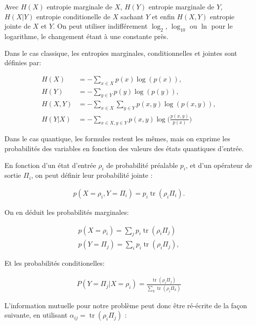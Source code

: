 \documentclass[12pt,a4paper]{article}
\DeclareMathOperator{\tr}{tr}
\begin{document}
    Avec $H(X)$ entropie marginale de $X$, $H(Y)$ entropie marginale de $Y$, $H(X|Y)$ entropie conditionelle de $X$ sachant $Y$ et enfin $H(X, Y)$ entropie jointe de $X$ et $Y$. On peut utiliser indifférement $\log_2$, $\log_{10}$ ou $\ln$ pour le logarithme, le changement étant à une constante près.

    Dans le cas classique, les entropies marginales, conditionnelles et jointes sont définies par: 
    
    \begin{align}
        H(X) &= -\displaystyle \sum_{x \in X} p(x) \log(p(x)) , \\
        H(Y) &= -\displaystyle \sum_{y \in Y} p(y) \log(p(y)) , \\
        H(X, Y) &= -\displaystyle \sum_{x \in X} \displaystyle \sum_{y \in Y} p(x, y) \log(p(x, y)), \\
        H(Y|X) &= -\displaystyle \sum_{x \in X, y \in Y} p(x, y) \log \big(\frac{p(x, y)}{p(x)}\big)
    \end{align}

    Dans le cas quantique, les formules restent les mêmes, mais on exprime les probabilités des variables en fonction des valeurs des états quantiques d'entrée.

    En fonction d'un état d'entrée $\rho_i$ de probabilité préalable $p_i$, et d'un opérateur de sortie $\Pi_i$, on peut définir leur probabilité jointe :

    \begin{align}
        p(X = \rho_i, Y = \Pi_i) = p_i \tr(\rho_i \Pi_i).
    \end{align}

    On en déduit les probabilités marginales:

    \begin{align}
        p(X = \rho_i) = \displaystyle \sum_{j}p_i \tr(\rho_i \Pi_j)  \\
        p(Y = \Pi_j) = \displaystyle \sum_{i}p_i \tr(\rho_i \Pi_j),
    \end{align}

    Et les probabilités conditionelles:

    \begin{align}
        P(Y=\Pi_j | X=\rho_i) = \frac{\tr(\rho_i \Pi_j)}{\displaystyle \sum_{k} \tr(\rho_i \Pi_k)}
    \end{align}

    L'information mutuelle pour notre problème peut donc être ré-écrite de la façon suivante, en utilisant $\alpha_{ij} = \tr(\rho_i \Pi_j)$ :
\end{document}
